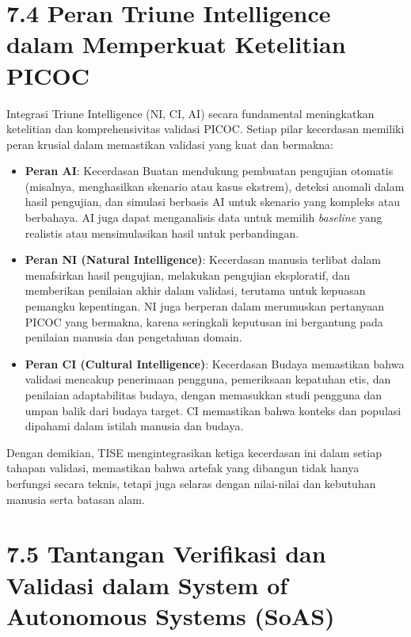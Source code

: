 \documentclass[
  letterpaper,
  DIV=11,
  numbers=noendperiod]{scrreprt}
\providecommand{\tightlist}{%
  \setlength{\itemsep}{0pt}\setlength{\parskip}{0pt}}
\begin{document}
\section{\texorpdfstring{\textbf{7.4 Peran Triune Intelligence dalam
Memperkuat Ketelitian
PICOC}}{7.4 Peran Triune Intelligence dalam Memperkuat Ketelitian PICOC}}\label{peran-triune-intelligence-dalam-memperkuat-ketelitian-picoc}

Integrasi Triune Intelligence (NI, CI, AI) secara fundamental
meningkatkan ketelitian dan komprehensivitas validasi PICOC. Setiap
pilar kecerdasan memiliki peran krusial dalam memastikan validasi yang
kuat dan bermakna:

\begin{itemize}
\tightlist
\item
  \textbf{Peran AI}: Kecerdasan Buatan mendukung pembuatan pengujian
  otomatis (misalnya, menghasilkan skenario atau kasus ekstrem), deteksi
  anomali dalam hasil pengujian, dan simulasi berbasis AI untuk skenario
  yang kompleks atau berbahaya. AI juga dapat menganalisis data untuk
  memilih \emph{baseline} yang realistis atau mensimulasikan hasil untuk
  perbandingan.
\item
  \textbf{Peran NI (Natural Intelligence)}: Kecerdasan manusia terlibat
  dalam menafsirkan hasil pengujian, melakukan pengujian eksploratif,
  dan memberikan penilaian akhir dalam validasi, terutama untuk kepuasan
  pemangku kepentingan. NI juga berperan dalam merumuskan pertanyaan
  PICOC yang bermakna, karena seringkali keputusan ini bergantung pada
  penilaian manusia dan pengetahuan domain.
\item
  \textbf{Peran CI (Cultural Intelligence)}: Kecerdasan Budaya
  memastikan bahwa validasi mencakup penerimaan pengguna, pemeriksaan
  kepatuhan etis, dan penilaian adaptabilitas budaya, dengan memasukkan
  studi pengguna dan umpan balik dari budaya target. CI memastikan bahwa
  konteks dan populasi dipahami dalam istilah manusia dan budaya.
\end{itemize}

Dengan demikian, TISE mengintegrasikan ketiga kecerdasan ini dalam
setiap tahapan validasi, memastikan bahwa artefak yang dibangun tidak
hanya berfungsi secara teknis, tetapi juga selaras dengan nilai-nilai
dan kebutuhan manusia serta batasan alam.

\section{\texorpdfstring{\textbf{7.5 Tantangan Verifikasi dan Validasi
dalam System of Autonomous Systems
(SoAS)}}{7.5 Tantangan Verifikasi dan Validasi dalam System of Autonomous Systems (SoAS)}}\label{tantangan-verifikasi-dan-validasi-dalam-system-of-autonomous-systems-soas}
\end{document}
